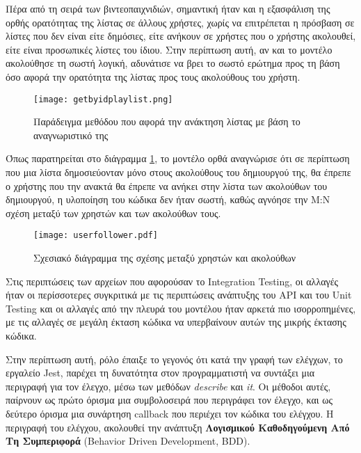 Πέρα από τη σειρά των βιντεοπαιχνιδιών, σημαντική ήταν και η εξασφάλιση
της ορθής ορατότητας της λίστας σε άλλους χρήστες, χωρίς να επιτρέπεται
η πρόσβαση σε λίστες που δεν είναι είτε δημόσιες, είτε ανήκουν σε
χρήστες που ο χρήστης ακολουθεί, είτε είναι προσωπικές λίστες του ίδιου.
Στην περίπτωση αυτή, αν και το μοντέλο ακολούθησε τη σωστή λογική,
αδυνάτισε να βρει το σωστό ερώτημα προς τη βάση όσο αφορά την ορατότητα
της λίστας προς τους ακολούθους του χρήστη.

\begin{figure}[H]
  \begin{center}
    \texttt{[image: getbyidplaylist.png]}
    \caption{Παράδειγμα μεθόδου που αφορά την ανάκτηση λίστας με βάση το
      αναγνωριστικό της}
  \end{center}
  \label{fig:getByIdPlaylist}
\end{figure}

Όπως παρατηρείται στο διάγραμμα \ref{fig:getByIdPlaylist}, το μοντέλο
ορθά αναγνώρισε ότι σε περίπτωση που μια λίστα δημοσιεύονταν μόνο στους
ακολούθους του δημιουργού της, θα έπρεπε ο χρήστης που την ανακτά θα
έπρεπε να ανήκει στην λίστα των ακολούθων του δημιουργού, η υλοποίηση
του κώδικα δεν ήταν σωστή, καθώς αγνόησε την Μ:Ν σχέση μεταξύ των
χρηστών και των ακολούθων τους.

\begin{figure}[H]
  \begin{center}
    \texttt{[image: userfollower.pdf]}
    \caption{Σχεσιακό διάγραμμα της σχέσης μεταξύ χρηστών και ακολούθων}
  \end{center}
  \label{fig:userFollower}
\end{figure}

Στις περιπτώσεις των αρχείων που αφορούσαν το \textlatin{Integration
  Testing}, οι αλλαγές ήταν οι περίσσοτερες συγκριτικά με τις
περιπτώσεις ανάπτυξης του \textlatin{API} και του \textlatin{Unit
  Testing} και οι αλλαγές από την πλευρά του μοντέλου ήταν αρκετά πιο
ισορροπημένες, με τις αλλαγές σε μεγάλη έκταση κώδικα να υπερβαίνουν
αυτών της μικρής έκτασης κώδικα.

Στην περίπτωση αυτή, ρόλο έπαιξε το γεγονός ότι κατά την γραφή των
ελέγχων, το εργαλείο \textlatin{Jest}, παρέχει τη δυνατότητα στον
προγραμματιστή να συντάξει μια περιγραφή για τον έλεγχο, μέσω των
μεθόδων \textit{\textlatin{describe}} και \textit{\textlatin{it}}. Οι
μέθοδοι αυτές, παίρνουν ως πρώτο όρισμα μια συμβολοσειρά που περιγράφει
τον έλεγχο, και ως δεύτερο όρισμα μια συνάρτηση \textlatin{callback}
\cite{crockfordjavascript} που περιέχει τον κώδικα του ελέγχου. Η
περιγραφή του ελέγχου, ακολουθεί την ανάπτυξη \textbf{Λογισμικού
  Καθοδηγούμενη Από Τη Συμπεριφορά} (\textlatin{Behavior Driven
  Development, BDD}).

